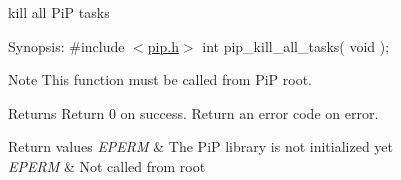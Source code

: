 kill all Pi\-P tasks

\begin{DoxyParagraph}{Synopsis\-:}
\#include $<$\hyperlink{pip_8h_source}{pip.\-h}$>$ int pip\-\_\-kill\-\_\-all\-\_\-tasks( void );
\end{DoxyParagraph}
\begin{DoxyNote}{Note}
This function must be called from Pi\-P root.
\end{DoxyNote}
\begin{DoxyReturn}{Returns}
Return 0 on success. Return an error code on error. 
\end{DoxyReturn}

\begin{DoxyRetVals}{Return values}
{\em E\-P\-E\-R\-M} & The Pi\-P library is not initialized yet \\
\hline
{\em E\-P\-E\-R\-M} & Not called from root \\
\hline
\end{DoxyRetVals}
